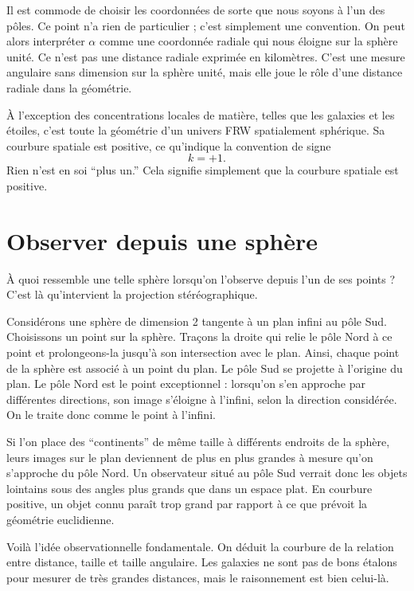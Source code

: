 Il est commode de choisir les coordonnées de sorte que nous soyons à l’un des pôles. Ce point n’a rien de particulier ; c’est simplement une convention. On peut alors interpréter \(\alpha\) comme une coordonnée radiale qui nous éloigne sur la sphère unité. Ce n’est pas une distance radiale exprimée en kilomètres. C’est une mesure angulaire sans dimension sur la sphère unité, mais elle joue le rôle d’une distance radiale dans la géométrie.

À l’exception des concentrations locales de matière, telles que les galaxies et les étoiles, c’est toute la géométrie d’un univers FRW spatialement sphérique. Sa courbure spatiale est positive, ce qu’indique la convention de signe
\begin{equation}
k=+1.
\end{equation}
Rien n’est en soi ``plus un.'' Cela signifie simplement que la courbure spatiale est positive.

\section{Observer depuis une sphère}

À quoi ressemble une telle sphère lorsqu’on l’observe depuis l’un de ses points ? C’est là qu’intervient la projection stéréographique.

Considérons une sphère de dimension 2 tangente à un plan infini au pôle Sud. Choisissons un point sur la sphère. Traçons la droite qui relie le pôle Nord à ce point et prolongeons-la jusqu’à son intersection avec le plan. Ainsi, chaque point de la sphère est associé à un point du plan. Le pôle Sud se projette à l’origine du plan. Le pôle Nord est le point exceptionnel : lorsqu’on s’en approche par différentes directions, son image s’éloigne à l’infini, selon la direction considérée. On le traite donc comme le point à l’infini.

Si l’on place des ``continents'' de même taille à différents endroits de la sphère, leurs images sur le plan deviennent de plus en plus grandes à mesure qu’on s’approche du pôle Nord. Un observateur situé au pôle Sud verrait donc les objets lointains sous des angles plus grands que dans un espace plat. En courbure positive, un objet connu paraît trop grand par rapport à ce que prévoit la géométrie euclidienne.

Voilà l’idée observationnelle fondamentale. On déduit la courbure de la relation entre distance, taille et taille angulaire. Les galaxies ne sont pas de bons étalons pour mesurer de très grandes distances, mais le raisonnement est bien celui-là.

